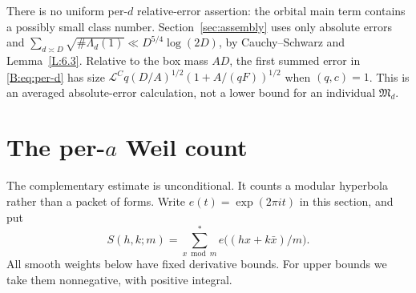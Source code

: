 \documentclass[10pt,reqno]{amsart}
\theoremstyle{definition}
\numberwithin{equation}{section}
\newcommand{\cL}{\mathcal L}
\begin{document}
There is no uniform per-\(d\) relative-error assertion: the orbital
main term contains a possibly small class number. Section~\ref{sec:assembly}
uses only absolute errors and
\(\sum_{d\asymp D}\sqrt{\#\Lambda_d(1)}\ll D^{5/4}\log(2D)\),
by Cauchy--Schwarz and Lemma~\ref{L:6.3}. Relative to the box mass
\(AD\), the first summed error in \eqref{B:eq:per-d} has size
\(\cL^Cq(D/A)^{1/2}(1+A/(qF))^{1/2}\) when \((q,c)=1\).
This is an averaged absolute-error calculation, not a lower bound for
an individual \(\mathfrak M_d\).

\section{The per-\texorpdfstring{$a$}{a} Weil count}\label{sec:pera}
The complementary estimate is unconditional.  It counts a modular hyperbola
rather than a packet of forms.  Write $e(t)=\exp(2\pi it)$ in this section,
and put
\[
 S(h,k;m)=\sum_{x\bmod m}^{*}e\bigl((hx+k\bar x)/m\bigr).
\]
All smooth weights below have fixed derivative bounds.  For upper bounds
we take them nonnegative, with positive integral.
\end{document}
